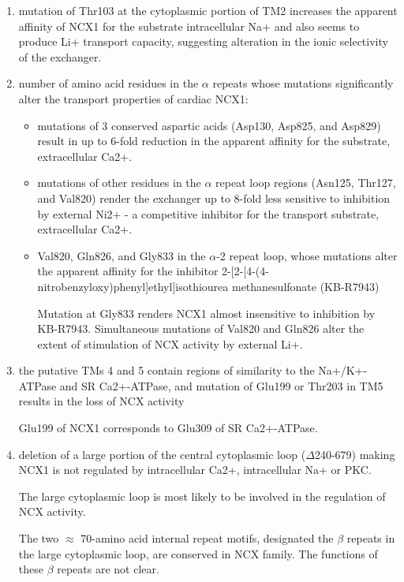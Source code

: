 \begin{itemize}
\begin{enumerate}
  \item mutation of Thr103 at the cytoplasmic portion of TM2 increases the
  apparent affinity of NCX1 for the substrate intracellular Na+ and also seems
  to produce Li+ transport capacity, suggesting alteration in the ionic
  selectivity of the exchanger.
  
  \item number of amino acid residues in the $\alpha$ repeats
whose mutations significantly alter the transport properties of cardiac NCX1:
\begin{itemize}
  \item  mutations of 3 conserved aspartic acids (Asp130, Asp825, and Asp829)
result in up to 6-fold reduction in the apparent affinity for the substrate,
extracellular Ca2+.

  \item mutations of other residues in the $\alpha$ repeat loop regions (Asn125,
  Thr127, and Val820) render the exchanger up to 8-fold less sensitive to
  inhibition by external Ni2+ - a competitive inhibitor for the transport
  substrate, extracellular Ca2+.
  
  \item Val820, Gln826, and Gly833 in the $\alpha$-2 repeat loop, whose
mutations alter the apparent affinity for the inhibitor 
2-[2-[4-(4-nitrobenzyloxy)phenyl]ethyl]isothiourea methanesulfonate (KB-R7943)

Mutation at Gly833 renders NCX1 almost insensitive to inhibition by KB-R7943.
Simultaneous mutations of Val820 and Gln826 alter the extent of stimulation of
NCX activity by external Li+.

\end{itemize}

  \item the putative TMs 4 and 5 contain regions of similarity to the
  Na+/K+-ATPase and SR Ca2+-ATPase, and mutation of Glu199 or Thr203 in
TM5 results in the loss of NCX activity

Glu199 of NCX1 corresponds to Glu309 of SR Ca2+-ATPase.

  \item deletion of a large portion of the central cytoplasmic loop
  ($\Delta$240-679) making NCX1 is not regulated by intracellular Ca2+,
  intracellular Na+ or PKC.

The large cytoplasmic loop is most likely to be involved in the regulation of
NCX activity.

The two $\approx$ 70-amino acid internal repeat motifs, designated
the $\beta$ repeats in the large cytoplasmic loop, are conserved in NCX family.
The functions of these $\beta$ repeats are not clear.


\end{enumerate}
\end{itemize}
